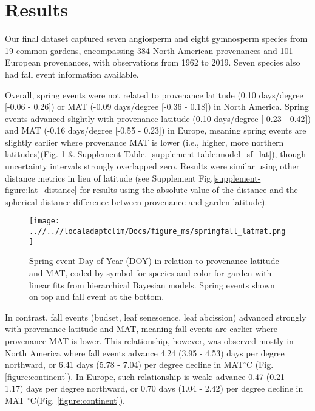 \documentclass{article}
\begin{document}
\section{Results}
Our final dataset captured seven angiosperm and eight gymnosperm species from 19 common gardens, encompassing 384 North American provenances and 101 European provenances, with observations from 1962 to 2019. Seven species also had fall event information available. 
\\



Overall, spring events were not related to provenance latitude (0.10 days/degree [-0.06 - 0.26]) or MAT (-0.09 days/degree [-0.36 - 0.18]) in North America.  Spring events advanced slightly with provenance latitude (0.10 days/degree [-0.23 - 0.42]) and MAT (-0.16 days/degree [-0.55 - 0.23]) in Europe, meaning spring events are slightly earlier where provenance MAT is lower (i.e., higher, more northern latitudes)(Fig. \ref{figure:springfall_latmat} \& Supplement Table. \ref{supplement-table:model_sf_lat}), though uncertainty intervals strongly overlapped zero. Results were similar using other distance metrics in lieu of latitude (see Supplement Fig.\ref{supplement-figure:lat_distance} for results using the absolute value of the distance and the spherical distance difference between provenance and garden latitude). 

\begin{figure}[!h] 
    \centering
 \texttt{[image: ..//..//localadaptclim/Docs/figure\_ms/springfall\_latmat.png]}
    \caption{Spring event Day of Year (DOY) in relation to provenance latitude and MAT, coded by symbol for species and color for garden with linear fits from hierarchical Bayesian models. Spring events shown on top and fall event at the bottom.} 
    \label{figure:springfall_latmat}
\end{figure}


In contrast, fall events (budset, leaf senescence, leaf abcission) advanced strongly with provenance latitude and MAT, meaning fall events are earlier where provenance MAT is lower. This relationship, however, was observed mostly in North America where fall events advance 4.24 (3.95 - 4.53) days per degree northward, or 6.41 days (5.78 - 7.04) per degree decline in MAT$^{\circ}$C (Fig. \ref{figure:continent}). In Europe, such relationship is weak: advance 0.47 (0.21 - 1.17) days per degree northward, or 0.70 days (1.04 - 2.42) per degree decline in MAT $^{\circ}$C(Fig. \ref{figure:continent}). 
\end{document}
